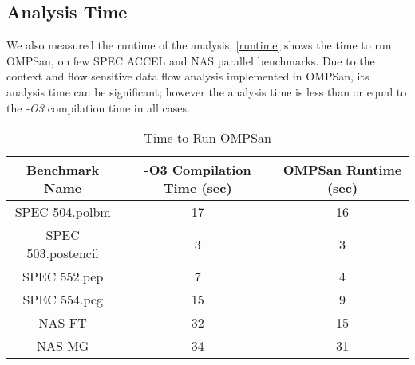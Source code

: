 \subsection{Analysis Time}
We also measured the runtime of the analysis, 
\autoref{runtime} shows the time to run OMPSan, on few SPEC ACCEL and 
NAS parallel benchmarks. 
Due to the context and flow sensitive data flow analysis implemented in 
OMPSan, 
its analysis time can be significant; 
however the analysis time is less than or equal to the \textit{-O3}
compilation time in all cases.
\begin{table} 
\vspace{-20pt}
    \caption{Time to Run OMPSan}
    \label{runtime}
    \begin{center}
        \scriptsize
        \begin{tabular}{ | c | c | c |}
            \hline
           Benchmark Name &  -O3 Compilation Time (sec)
           & OMPSan Runtime (sec) \\ \hline    
           SPEC 504.polbm & 17 & 16 \\ \hline    
           SPEC 503.postencil & 3 & 3 \\ \hline    
           SPEC 552.pep  & 7 & 4 \\ \hline    
           SPEC 554.pcg & 15 & 9\\ \hline    
           NAS FT & 32 & 15 \\ \hline    
           NAS MG & 34 & 31              \\ \hline                       
        \end{tabular}        
    \end{center}
\end{table}\vspace{-40pt}
